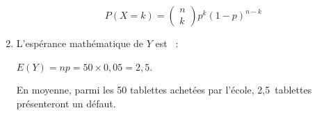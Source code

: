 \begin{corrige}
\begin{enumerate}
{               \[ P\left(X=k\right)=\begin{pmatrix} n \\ k \end{pmatrix}p^{k} \left(1-p\right)^{n-k} \]
          }
          \par
          \item %
          L'espérance mathématique de $Y$ est ~:
          \par
          $E(Y)=np=50 \times 0,05=2,5$.
          \par
          En moyenne, parmi les 50 tablettes achetées par l'école, 2,5~tablettes présenteront un défaut.
          \par
          \par
     \end{enumerate}
\end{corrige}
